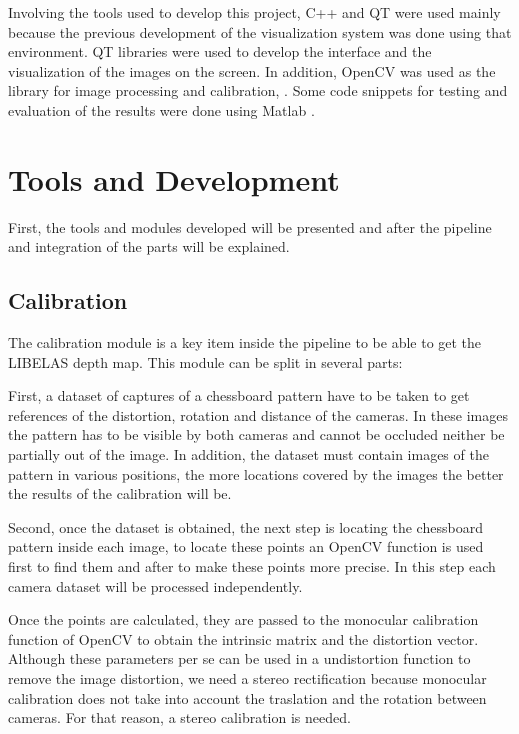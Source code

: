 \documentclass[10pt,a4paper,twocolumn,twoside]{article}
\begin{document}
	Involving the tools used to develop this project, C++ and QT \cite{web:qt} were used mainly because the previous development of the visualization system was done using that environment. QT libraries were used to develop the interface and the visualization of the images on the screen. In addition, OpenCV was used as the library for image processing and calibration, \cite{web:opencv}. Some code snippets for testing and evaluation of the results were done using Matlab \cite{web:matlab}. 
	
	
	\section{Tools and Development}
	
	First, the tools and modules developed will be presented and after the pipeline and integration of the parts will be explained. 
	
	\subsection{Calibration}
	\label{sec:calib}
	
	The calibration module is a key item inside the pipeline to be able to get the LIBELAS depth map. This module can be split in several parts:  
	
	First, a dataset of captures of a chessboard pattern have to be taken to get references of the distortion, rotation and distance of the cameras. In these images the pattern has to be visible by both cameras and cannot be occluded neither be partially out of the image. In addition, the dataset must contain images of the pattern in various positions, the more locations covered by the images the better the results of the calibration will be. 
	
	Second, once the dataset is obtained, the next step is locating the chessboard pattern inside each image, to locate these points an OpenCV function is used first to find them and after to make these points more precise. In this step each camera dataset will be processed independently. 
	
	Once the points are calculated, they are passed to the monocular calibration function of OpenCV to obtain the intrinsic matrix and the distortion vector.  Although these parameters per se can be used in a undistortion function to remove the image distortion, we need a stereo rectification because monocular calibration does not take into account the traslation and the rotation between cameras. For that reason, a stereo calibration is needed. 
	
\end{document}
